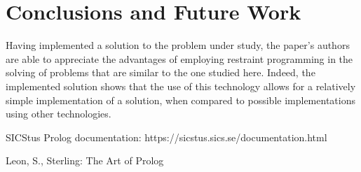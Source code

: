 \documentclass{llncs}
\begin{document}
 \section{Conclusions and Future Work}
 Having implemented a solution to the problem under study, the paper's authors are able to appreciate the advantages of employing restraint programming in the solving of problems that are similar to the one studied here. Indeed, the implemented solution shows that the use of this technology allows for a relatively simple implementation of a solution, when compared to possible implementations using other technologies.
 
%
%
\begin{thebibliography}{2}
%


SICStus Prolog documentation:
https://sicstus.sics.se/documentation.html

Leon, S., Sterling:
The Art of Prolog

\end{thebibliography}
\end{document}
